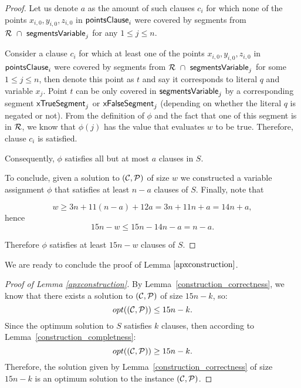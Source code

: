 \begin{proof}
Let us denote $a$ as the amount of such clauses $c_i$ for which none of
the points $x_{i,0}, y_{i,0}, z_{i,0}$ in $\mathsf{pointsClause}_{i}$ were covered by
segments from $\mathcal{R}~\cap~\mathsf{segmentsVariable}_{j}$ for any $1 \le j \le n$.

Consider a clause $c_i$ for which at least one of the points
$x_{i,0}, y_{i,0}, z_{i,0}$ in $\mathsf{pointsClause}_{i}$ were covered by
segments from $\mathcal{R}~\cap~\mathsf{segmentsVariable}_{j}$ for some $1 \le j \le n$,
then denote this point as $t$ and say it corresponds to
literal $q$ and variable $x_j$.
Point $t$ can be only covered in $\mathsf{segmentsVariable}_{j}$
by a corresponding segment $\mathsf{xTrueSegment}_{j}$ or $\mathsf{xFalseSegment}_{j}$
(depending on whether the literal $q$ is negated or not).
From the definition of $\phi$ and the fact that one of this segment is
in $\mathcal{R}$, we know that
$\phi(j)$ has the value that evaluates $w$ to be true.
Therefore, clause $c_i$ is satisfied.

Consequently, $\phi$ satisfies all but at most $a$ clauses in $S$.

To conclude,
given a solution to $(\mathcal{C}, \mathcal{P})$ of size $w$ we constructed
a variable assignment $\phi$
that satisfies at least $n-a$ clauses of $S$.
Finally, note that

$$w \ge 3n + 11(n-a) + 12a = 3n + 11n + a = 14n + a,$$
hence
$$15n - w  \le 15n - 14n - a = n - a.$$

Therefore $\phi$ satisfies at least $15n-w$ clauses of $S$.
\end{proof}

We are ready to conclude the proof of Lemma $\ref{apxconstruction}$.

\begin{proof}[Proof of Lemma \ref{apxconstruction}]
By Lemma~\ref{construction_correctness}, we know
that there exists a solution to $(\mathcal{C}, \mathcal{P})$ of size $15n-k$, so: 
$$opt((\mathcal{C}, \mathcal{P})) \le 15n - k.$$
Since the optimum solution to $S$ satisfies $k$ clauses,
then according to Lemma~\ref{construction_completness}:
$$opt((\mathcal{C}, \mathcal{P})) \ge 15n -k.$$
Therefore, the solution given by Lemma~\ref{construction_correctness} 
of size $15n - k$ is an optimum solution to the instance $(\mathcal{C}, \mathcal{P})$.
\end{proof}
